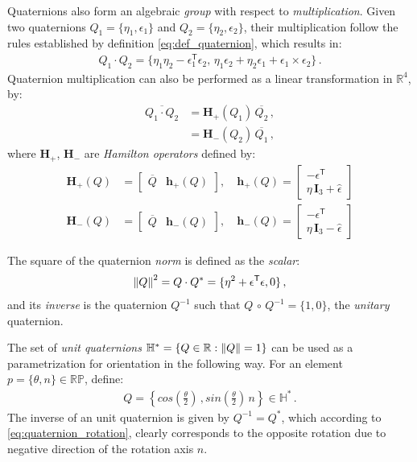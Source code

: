 Quaternions also form an algebraic {\it group} with respect to {\it multiplication}.
Given two quaternions $Q_1=\{\eta_1,\epsilon_1\}$ and $Q_2=\{\eta_2,\epsilon_2\}$, their multiplication follow the rules established by definition \eqref{eq:def_quaternion}, which results in:
%
\begin{align}
Q_1\cdot Q_2 = \{\eta_1\eta_2 - \epsilon_1^\mathsf{T}\epsilon_2 ,\, \eta_1\epsilon_2 + \eta_2\epsilon_1 + \epsilon_1 \times \epsilon_2 \} \,.
\label{eq:quaternion_product}
\end{align}
%
Quaternion multiplication can also be performed as a linear transformation in $\mathbb{R}^4$, by:
%
\begin{align}
\overline{Q_1 \cdot Q_2} &= \mathbf{H}_+(Q_1) \, \overline{Q_2} \,, \\
&= \mathbf{H}_-(Q_2) \, \overline{Q_1} \,,
\label{eq:multipl_Hamilton}
\end{align}
%
where $\mathbf{H}_+$, $\mathbf{H}_-$ are {\it Hamilton operators} defined by:
%
\begin{align}
\mathbf{H}_+(Q) &= \left[ \begin{array}{cc}
\overline{Q} & \mathbf{h}_+(Q)
\end{array} \right], \quad
%
\mathbf{h}_+(Q) = 
\left[ \begin{array}{cc}
-\epsilon^\mathsf{T} \\
\eta \, \mathbf{I}_3 + \widehat{\epsilon}
\end{array} \right] \\
%
\mathbf{H}_-(Q) &= \left[ \begin{array}{cc}
\overline{Q} & \mathbf{h}_-(Q)
\end{array} \right], \quad
%
\mathbf{h}_-(Q) = 
\left[ \begin{array}{cc}
-\epsilon^\mathsf{T} \\
\eta \, \mathbf{I}_3 - \widehat{\epsilon}
\end{array} \right]
\label{eq:Hamilton_op}
\end{align}

The square of the quaternion \textit{norm} is defined as the \textit{scalar}:
%
\begin{align}
\left\lVert Q\right\rVert^2 = Q \cdot Q^* = \{ \eta^2 + \epsilon^\mathsf{T} \epsilon , 0 \} \,,
\end{align}
%
and its \textit{inverse} is the quaternion $Q^{-1}$ such that $Q \,\circ\, Q^{-1} = \{1,0\}$, the {\it unitary} quaternion.

The set of \textit{unit quaternions} $\mathbb{H}^* = \{ Q \in \mathbb{R}: \left\lVert Q\right\rVert = 1 \}$ can be used as a parametrization for orientation in the following way.
%
For an element $p = \{\theta,n\}\in \mathbb{RP}$, define:
%
\begin{align}
Q = \left\{cos\left(\frac{\theta}{2}\right) \,, sin\left(\frac{\theta}{2}\right)\,n\right\} \in \mathbb{H}^* \,.
\label{eq:quaternion_rotation}
\end{align}
%
The inverse of an unit quaternion is given by $Q^{-1} \!\!=\!\! Q^*$, 
which according to \eqref{eq:quaternion_rotation}, clearly corresponds to the opposite rotation due to negative direction of the rotation axis $n$.

